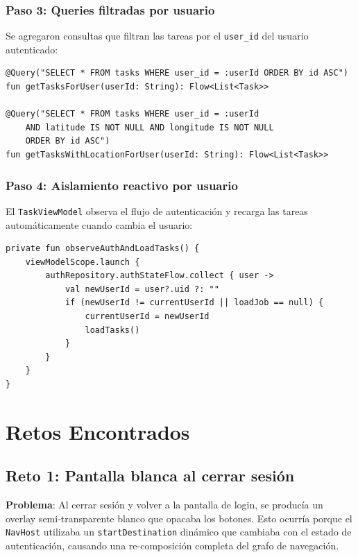 \documentclass[12pt,a4paper]{article}
\begin{document}
\subsubsection{Paso 3: Queries filtradas por usuario}

Se agregaron consultas que filtran las tareas por el \texttt{user\_id} del usuario autenticado:

\begin{lstlisting}[caption={Queries de TaskDao filtradas por usuario}]
@Query("SELECT * FROM tasks WHERE user_id = :userId ORDER BY id ASC")
fun getTasksForUser(userId: String): Flow<List<Task>>

@Query("SELECT * FROM tasks WHERE user_id = :userId 
    AND latitude IS NOT NULL AND longitude IS NOT NULL 
    ORDER BY id ASC")
fun getTasksWithLocationForUser(userId: String): Flow<List<Task>>
\end{lstlisting}

\subsubsection{Paso 4: Aislamiento reactivo por usuario}

El \texttt{TaskViewModel} observa el flujo de autenticación y recarga las tareas automáticamente cuando cambia el usuario:

\begin{lstlisting}[caption={TaskViewModel reactivo al cambio de usuario}]
private fun observeAuthAndLoadTasks() {
    viewModelScope.launch {
        authRepository.authStateFlow.collect { user ->
            val newUserId = user?.uid ?: ""
            if (newUserId != currentUserId || loadJob == null) {
                currentUserId = newUserId
                loadTasks()
            }
        }
    }
}
\end{lstlisting}

\section{Retos Encontrados}

\subsection{Reto 1: Pantalla blanca al cerrar sesión}

\textbf{Problema}: Al cerrar sesión y volver a la pantalla de login, se producía un overlay semi-transparente blanco que opacaba los botones. Esto ocurría porque el \texttt{NavHost} utilizaba un \texttt{startDestination} dinámico que cambiaba con el estado de autenticación, causando una re-composición completa del grafo de navegación.
\end{document}
